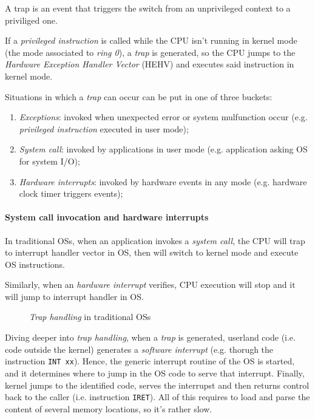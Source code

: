 \begin{definition}[Trap]
    A trap is an event that triggers the switch from an unprivileged context to
    a priviliged one.
\end{definition}\noindent
If a \emph{privileged instruction} is called while the CPU isn't running in
kernel mode (the mode associated to \emph{ring 0}), a \emph{trap} is generated,
so the CPU jumps to the \emph{Hardware Exception Handler Vector} (HEHV) and
executes said instruction in kernel mode.

Situations in which a \emph{trap} can occur can be put in one of three buckets:
\begin{enumerate}
    \item\emph{Exceptions}: invoked when unexpected error or system mulfunction
    occur (e.g. \emph{privileged instruction} executed in user mode);
    \item\emph{System call}: invoked by applications in user mode (e.g.
    application asking OS for system I/O);
    \item\emph{Hardware interrupts}: invoked by hardware events in any mode
    (e.g. hardware clock timer triggers events);
\end{enumerate}

\paragraph{System call invocation and hardware interrupts}
In traditional OSs, when an application invokes a \emph{system call}, the CPU
will trap to interrupt handler vector in OS, then will switch to kernel mode
and execute OS instructions.

Similarly, when an \emph{hardware interrupt} verifies, CPU execution will stop
and it will jump to interrupt handler in OS.

\begin{figure}[h!]
    \centering
    \caption{\emph{Trap handling} in traditional OSs}
\end{figure}

\noindent
Diving deeper into \emph{trap handling}, when a \emph{trap} is generated,
userland code (i.e. code outside the kernel) generates a \emph{software
interrupt} (e.g. thorugh the instruction \texttt{INT xx}). Hence, the generic
interrupt routine of the OS is started, and it determines where to jump in the
OS code to serve that interrupt. Finally, kernel jumps to the identified code,
serves the interrupst and then returns control back to the caller (i.e.
instruction \texttt{IRET}). All of this requires to load and parse the content
of several memory locations, so it's rather slow.

